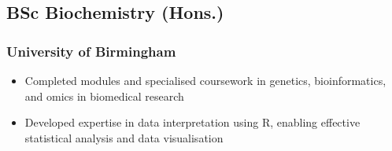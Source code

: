 \documentclass{article}
\begin{document}
\begin{paracol}{2}
  \subsection{BSc Biochemistry (Hons.)}
  \subsubsection{University of Birmingham}
  \hspace*{\fill}{\small Graduated 2019}
  \begin{itemize}[leftmargin=*]
    \setlength\itemsep{-2pt}
    \item Completed modules and specialised coursework in genetics, bioinformatics, and omics in biomedical research
    \item Developed expertise in data interpretation using R, enabling effective statistical analysis and data visualisation
  \end{itemize}




\end{paracol}
\end{document}
